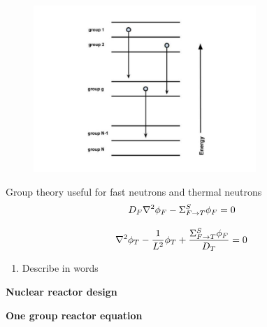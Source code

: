 \documentclass[aspectratio=1610,pdftex,dvipsnames,compress,xcolor={dvipsnames}]{beamer}
\begin{document}
\begin{frame}{}
    \begin{figure}
        \centering
        \includegraphics[width=0.75\textwidth]{groups.jpg}
    \end{figure}
\end{frame}


\begin{frame}{Group theory useful for fast neutrons and thermal neutrons}
    \begin{equation}
        \LARGE
        D_F \nabla^2 \phi_F - \Sigma_{F \rightarrow T}^S \phi_F = 0
    \end{equation}

    \begin{equation}
        \LARGE
        \nabla^2 \phi_T - \frac{1}{L^2} \phi_T + \frac{\Sigma_{F \rightarrow T}^S \phi_F}{D_T} = 0
    \end{equation}

    \vspace*{\fill}

    \begin{enumerate}[series=outerlist,topsep=0pt,itemsep=21pt,leftmargin=*,label=(\arabic*)]
        \item[]Describe in words
    \end{enumerate}
\end{frame}


\begin{frame}[plain]{}
    \centering\LARGE\textbf{Nuclear reactor design}
\end{frame}


\begin{frame}[plain]{}
    \centering\LARGE\textbf{One group reactor equation}
\end{frame}
\end{document}
